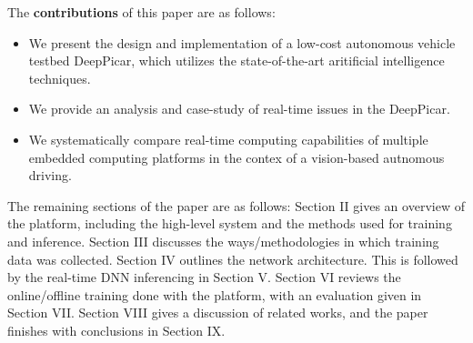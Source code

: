 
The {\bf contributions} of this paper are as follows:
\begin{itemize}
  \item We present the design and implementation of a
    low-cost autonomous vehicle testbed DeepPicar, which utilizes the
    state-of-the-art aritificial intelligence techniques.
  \item We provide an analysis and case-study of real-time issues in the
    DeepPicar.
  \item We systematically compare real-time computing capabilities of
    multiple embedded computing platforms in the contex of a
    vision-based autnomous driving.
\end{itemize}




The remaining sections of the paper are as follows: Section II gives
an overview of the platform, including the high-level system and the
methods used for training and inference. Section III discusses the
ways/methodologies in which training data was collected. Section IV
outlines the network architecture. This is followed by the real-time
DNN inferencing in Section V. Section VI reviews the online/offline
training done with the platform, with an evaluation given in Section
VII. Section VIII gives a discussion of related works, and the paper
finishes with conclusions in Section IX. 


